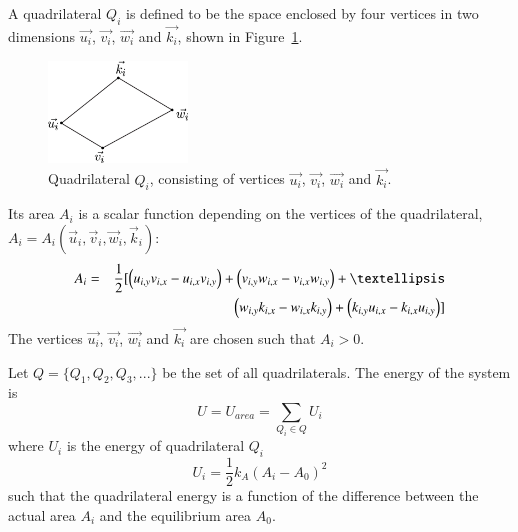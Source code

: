 A quadrilateral $Q_i$ is defined to be the space enclosed by four vertices in two dimensions  $\vec{u_i}$, $\vec{v_i}$, $\vec{w_i}$ and $\vec{k_i}$, shown in Figure~\ref{Tetrahedron}.
\begin{figure}[ht]
\begin{center}
\includegraphics[width=0.33\textwidth, clip=true]{./Chapters/03_GLM/./Images/Quadrilateral} 
\caption{Quadrilateral $Q_i$, consisting of vertices $\vec{u_i}$, $\vec{v_i}$, $\vec{w_i}$ and $\vec{k_i}$.}
\label{Tetrahedron}
\end{center}
\end{figure}
Its area $A_i$ is a scalar function depending on the vertices of the quadrilateral,~$A_i=A_i(\vec{u}_i, \vec{v}_i, \vec{w}_i, \vec{k}_i)$: 
\begin{eqnarray}
A_i&=&\frac{1}{2}
[\left( u_{i,y} v_{i,x} - u_{i,x} v_{i,y} \right) + \left( v_{i,y} w_{i,x} - v_{i,x} w_{i,y} \right) + \textellipsis \\
& & \left( w_{i,y} k_{i,x} - w_{i,x} k_{i,y} \right) + \left( k_{i,y} u_{i,x} - k_{i,x} u_{i,y} \right) ]
\label{areaQ}
\end{eqnarray}
The vertices $\vec{u_i}$, $\vec{v_i}$, $\vec{w_i}$ and $\vec{k_i}$ are chosen such that $A_i > 0$.

Let $Q = \{Q_1, Q_2, Q_3, ...\}$ be the set of all quadrilaterals. The energy of the system is
\begin{equation}
U=U_{area}=\sum\limits_{Q_i\in Q}U_i
\end{equation}
where $U_i$ is the energy of quadrilateral $Q_i$
\begin{equation}
U_i=\frac{1}{2}k_A \left(A_i-A_0\right)^2
\end{equation}
such that the quadrilateral energy is a function of the difference between the actual area $A_i$ and the equilibrium area $A_0$. 


